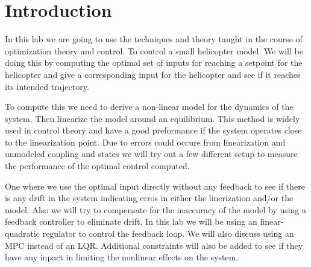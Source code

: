 \section{Introduction}
In this lab we are going to use the techniques and theory taught in the course of optimization theory and control. To control a small helicopter model. We will be doing this by computing the optimal set of inputs for reaching a setpoint for the helicopter and give a corresponding input for the helicopter and see if it reaches its intended trajectory.

To compute this we need to derive a non-linear model for the dynamics of the system. Then linearize the model around an equilibrium. This method is widely used in
control theory and have a good preformance if the system operates close to the linearization point. Due to errors could occure from linearization and unmodeled coupling and states we will try out a few different setup to measure the performance of the optimal control computed.

One where we use the optimal input directly without any feedback to see if there is any drift in the system indicating erros in either the linerization and/or the model. Also we will try to compensate for the inaccuracy of the model by using a feedback controller to eliminate drift. In this lab we will be using an linear-quadratic regulator to control the feedback loop. We will also discuss using an MPC instead of an LQR. Additional constraints will also be added to see if they have any inpact in limiting the nonlinear effects on the system.